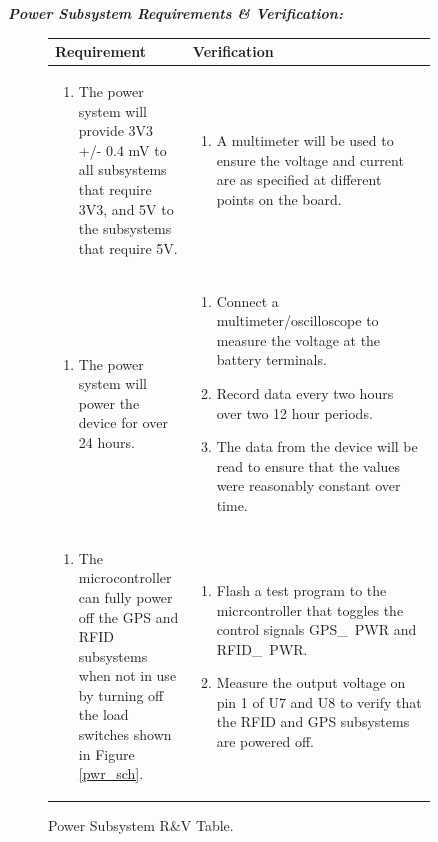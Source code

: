 \documentclass{article}
\begin{document}
\textit{\textbf{Power Subsystem Requirements \& Verification:}}

\begin{figure}[H]
	\begin{center}
		\begin{tabular}{|p{0.3 \linewidth}|p{0.6 \linewidth}|}
			\hline
			Requirement & Verification  \\
			\hline
			\begin{enumerate}
				\item The power system will provide 3V3 +/- 0.4 mV to all subsystems that require 3V3, and 5V to the subsystems that require 5V. 
			\end{enumerate}  & \begin{enumerate} 
				\item A multimeter will be used to ensure the voltage and current are as specified at different points on the board.
			\end{enumerate}
			\\
			\hline
			\begin{enumerate}
				\item The power system will power the device for over 24 hours. 
			\end{enumerate}  & \begin{enumerate}
				\item Connect a multimeter/oscilloscope to measure the voltage at the battery terminals. 
				\item Record data every two hours over two 12 hour periods. 
				\item The data from the device will be read to ensure that the values were reasonably constant over time.
			\end{enumerate} \\
			\hline
			\begin{enumerate}
				\item The microcontroller can fully power off the GPS and RFID subsystems when not in use by turning off the load switches shown in Figure \ref{pwr_sch}. 
			\end{enumerate}  & \begin{enumerate}
				\item Flash a test program to the micrcontroller that toggles the control signals GPS\_~PWR and RFID\_~PWR. 
				\item Measure the output voltage on pin 1 of U7 and U8 to verify that the RFID and GPS subsystems are powered off. 
			\end{enumerate} \\
			\hline
		\end{tabular}
	\end{center}
	\caption{Power Subsystem R\&V Table.}
\end{figure}
\end{document}
